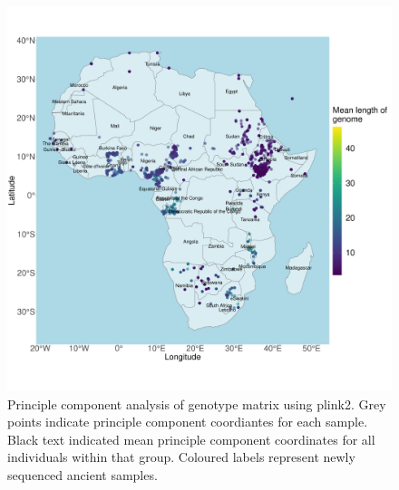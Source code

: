 \begin{figure}[htp]
    \centering
    \includegraphics[width=1.0\textwidth]{../images/appendix/haplotype_map_Brazil.pdf}
    \caption{Principle component analysis of genotype matrix using plink2. Grey points indicate principle component coordiantes for each sample. Black text indicated mean principle component coordinates for all individuals within that group. Coloured labels represent newly sequenced ancient samples. }
    \label{fig:haplotype_map_Brazil}
\end{figure}

